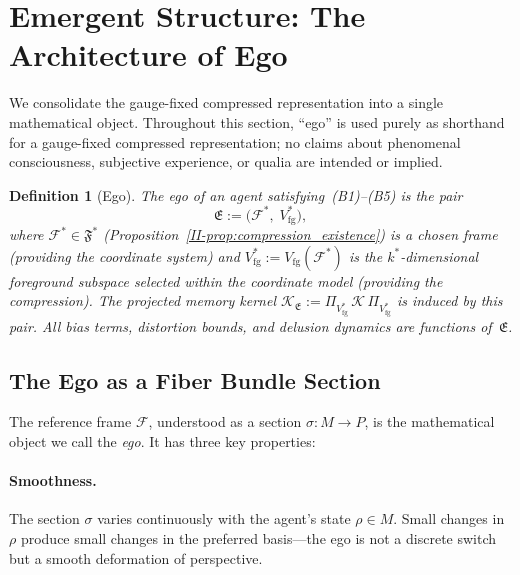 \documentclass[12pt,a4paper,openany]{book}
\newtheorem{definition}[theorem]{Definition}
\begin{document}
\section{Emergent Structure: The Architecture of Ego}
\label{II-sec:architecture}

We consolidate the gauge-fixed compressed representation
into a single mathematical object.
Throughout this section, ``ego'' is used purely as shorthand
for a gauge-fixed compressed representation; no claims about
phenomenal consciousness, subjective experience, or qualia
are intended or implied.

\begin{definition}[Ego]
\label{II-def:ego}
The \emph{ego} of an agent satisfying~\textup{(B1)--(B5)}
is the pair
\begin{equation}
\label{II-eq:ego}
\mathfrak{E}
:= \bigl(\mathcal{F}^*,\;
   V_{\mathrm{fg}}^*\bigr),
\end{equation}
where $\mathcal{F}^* \in \mathfrak{F}^*$
(Proposition~\ref{II-prop:compression_existence}) is a chosen frame
(providing the coordinate system) and
$V_{\mathrm{fg}}^*
:= V_{\mathrm{fg}}(\mathcal{F}^*)$ is the
$k^*$-dimensional foreground subspace selected within the coordinate
model (providing the compression).
The projected memory kernel
$\mathcal{K}_{\mathfrak{E}}
:= \Pi_{V_{\mathrm{fg}}^*}\,\mathcal{K}\,
\Pi_{V_{\mathrm{fg}}^*}$
is induced by this pair.
All bias terms, distortion bounds, and delusion dynamics
are functions of~$\mathfrak{E}$.
\end{definition}

\subsection{The Ego as a Fiber Bundle Section}
\label{II-subsec:section}

The reference frame $\mathcal{F}$, understood as a section
$\sigma: M \to P$, is the mathematical object we call the
\emph{ego}.
It has three key properties:

\paragraph{Smoothness.}
The section $\sigma$ varies continuously with the agent's
state $\rho \in M$.
Small changes in $\rho$ produce small changes in the
preferred basis---the ego is not a discrete switch but a
smooth deformation of perspective.
\end{document}
